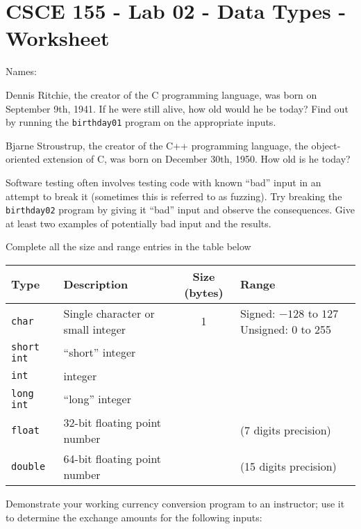 \documentclass[12pt]{exam}
\begin{document}
\section*{CSCE 155 - Lab 02 - Data Types - Worksheet}

Names: \underline{\hspace{10cm}}

\begin{questions}

\question Dennis Ritchie, the creator of the C programming language, 
was born on September 9th, 1941.  If he were still alive, how old 
would he be today?  Find out by running the \texttt{birthday01} 
program on the appropriate inputs.

\begin{solution}[1cm]
\end{solution}

\question Bjarne Stroustrup, the creator of the C++ programming 
language, the object-oriented extension of C, was born on December 
30th, 1950.  How old is he today? 

\begin{solution}[1cm]
\end{solution}

\question Software testing often involves testing code with known 
``bad'' input in an attempt to break it (sometimes this is referred
to as fuzzing).  Try breaking the \texttt{birthday02} 
program by giving it ``bad'' input and observe the consequences.  
Give at least two examples of potentially bad input and the results.

\begin{solution}[1cm]
\end{solution}

\question Complete all the size and range entries in the table below
\begin{table}[h]
\centering
\begin{tabular}{|l|l|c|p{4cm}|}
\hline
Type & Description & Size (bytes) & Range \\
\hline\hline
\texttt{char} & Single character or small integer & 1 & 
 Signed: $-128$ to $127$
 Unsigned: 0 to 255 \\
\hline
\texttt{short int} & ``short'' integer & ~ &  \vspace{1cm}\\
\hline
\texttt{int} & integer & ~ &  \vspace{1cm}\\
\hline
\texttt{long int} & ``long'' integer & ~ &  \vspace{1cm}\\
\hline
\texttt{float} & 32-bit floating point number & ~ & (7 digits precision)\\
\hline
\texttt{double} & 64-bit floating point number & ~ & (15 digits precision)\\
\hline
\end{tabular}
\end{table}
\newpage
\question Demonstrate your working currency conversion 
program to an instructor; use it to determine the exchange 
amounts for the following inputs:
\begin{parts}

\end{parts}
\end{questions}
\end{document}
